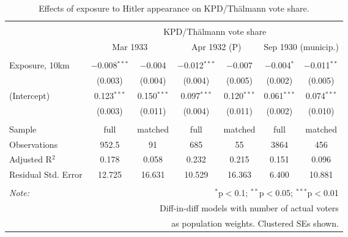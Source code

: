 
\begin{table}[!htbp] \centering 
  \caption{Effects of exposure to Hitler appearance on KPD/Thälmann vote share.} 
  \label{tab:nsdap-kpd-dd-2} 
\begin{tabular}{@{\extracolsep{5pt}}lcccccc} 
\\[-1.8ex]\hline 
\hline \\[-1.8ex] 
 & \multicolumn{6}{c}{KPD/Thälmann vote share} \\ 
\cline{2-7} 
 & \multicolumn{2}{c}{Mar 1933} & \multicolumn{2}{c}{Apr 1932 (P)} & \multicolumn{2}{c}{Sep 1930 (municip.)} \\ 
\hline \\[-1.8ex] 
 Exposure, 10km & $-$0.008$^{***}$ & $-$0.004 & $-$0.012$^{***}$ & $-$0.007 & $-$0.004$^{*}$ & $-$0.011$^{**}$ \\ 
  & (0.003) & (0.004) & (0.004) & (0.005) & (0.002) & (0.005) \\ 
  (Intercept) & 0.123$^{***}$ & 0.150$^{***}$ & 0.097$^{***}$ & 0.120$^{***}$ & 0.061$^{***}$ & 0.074$^{***}$ \\ 
  & (0.003) & (0.011) & (0.004) & (0.011) & (0.002) & (0.010) \\ 
 \hline \\[-1.8ex] 
Sample & full & matched & full & matched & full & matched \\ 
Observations & 952.5 & 91 & 685 & 55 & 3864 & 456 \\ 
Adjusted R$^{2}$ & 0.178 & 0.058 & 0.232 & 0.215 & 0.151 & 0.096 \\ 
Residual Std. Error & 12.725 & 16.631 & 10.529 & 16.363 & 6.400 & 10.881 \\ 
\hline 
\hline \\[-1.8ex] 
\textit{Note:}  & \multicolumn{6}{r}{$^{*}$p$<$0.1; $^{**}$p$<$0.05; $^{***}$p$<$0.01} \\ 
 & \multicolumn{6}{r}{Diff-in-diff models with number of actual voters} \\ 
 & \multicolumn{6}{r}{as population weights. Clustered SEs shown.} \\ 
\end{tabular} 
\end{table} 
